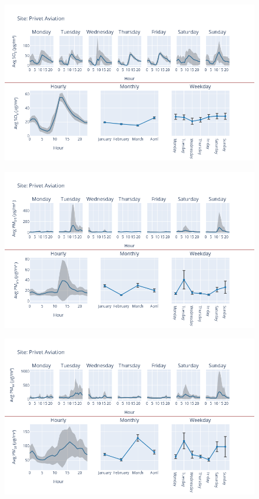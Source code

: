\documentclass[12pt, oneside]{book}
\begin{document}
{ 
{\begin{figure}[H] 
 \centering 
\includegraphics[width=.88\textwidth, keepaspectratio]{image113} 
 \end{figure}}{} 

{\begin{figure}[H] 
 \centering 
\includegraphics[width=.88\textwidth, keepaspectratio]{image114} 
 \end{figure}}{} 

{\begin{figure}[H] 
 \centering 
\includegraphics[width=.88\textwidth, keepaspectratio]{image115} 
 \end{figure}}{} 

}
\end{document}
